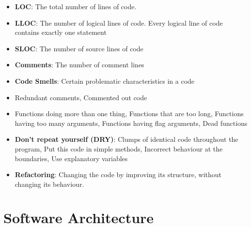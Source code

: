 \documentclass[a4paper]{article}
\begin{document}
\begin{itemize}
\begin{figure}[H]
\begin{subfigure}[b]{0.45\linewidth}
            \caption{CC Score}
        \end{subfigure}
    \end{figure}
    \item \textbf{LOC}: The total number of lines of code.
    \item \textbf{LLOC}: The number of logical lines of code. Every logical line of code contains exactly one statement
    \item \textbf{SLOC}: The number of source lines of code
    \item \textbf{Comments}: The number of comment lines
    \item \textbf{Code Smells}: Certain problematic characteristics in a code
    \item Redundant comments, Commented out code
    \item Functions doing more than one thing, Functions that are too long, Functions having too many arguments, Functions having flag arguments, Dead functions
    \item \textbf{Don’t repeat yourself (DRY)}: Clumps of identical code throughout the program, Put this code in simple methods, Incorrect behaviour at the boundaries, Use explanatory variables
    \item \textbf{Refactoring}: Changing the code by improving its structure, without changing its behaviour.
\end{itemize}

\section{Software Architecture}
\end{document}
